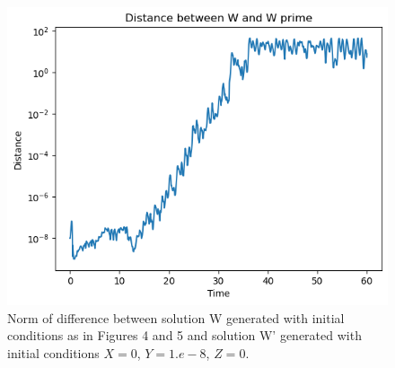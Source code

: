\documentclass{article}
\begin{document}
\begin{multicols}{2}
\begin{figure} [H]
    \centering
    \includegraphics[width=1.0\linewidth]{Assignment 3 Images/download (5).png}
    \caption{Norm of difference between solution W generated with initial conditions as in Figures 4 and 5 and solution W' generated with initial conditions $X = 0$, $Y = 1.e-8$, $Z=0$.}
    \label{fig:enter-label}
\end{figure}

\end{multicols}
\end{document}
